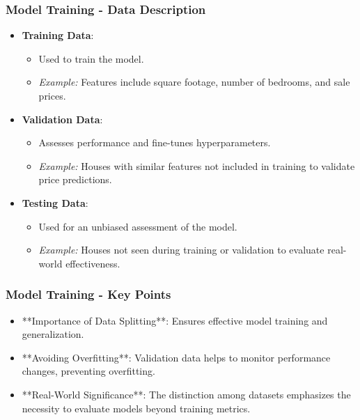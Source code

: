 \documentclass[aspectratio=169]{beamer}
\begin{document}
\begin{frame}[fragile]
    \frametitle{Model Training - Data Description}
    
    \begin{itemize}
        \item \textbf{Training Data}:
        \begin{itemize}
            \item Used to train the model.
            \item \textit{Example:} Features include square footage, number of bedrooms, and sale prices.
        \end{itemize}

        \item \textbf{Validation Data}:
        \begin{itemize}
            \item Assesses performance and fine-tunes hyperparameters.
            \item \textit{Example:} Houses with similar features not included in training to validate price predictions.
        \end{itemize}
        
        \item \textbf{Testing Data}:
        \begin{itemize}
            \item Used for an unbiased assessment of the model.
            \item \textit{Example:} Houses not seen during training or validation to evaluate real-world effectiveness.
        \end{itemize}
    \end{itemize}
\end{frame}

\begin{frame}[fragile]
    \frametitle{Model Training - Key Points}

    \begin{itemize}
        \item **Importance of Data Splitting**: Ensures effective model training and generalization.
        
        \item **Avoiding Overfitting**: Validation data helps to monitor performance changes, preventing overfitting.
        
        \item **Real-World Significance**: The distinction among datasets emphasizes the necessity to evaluate models beyond training metrics.
    \end{itemize}
\end{frame}
\end{document}
